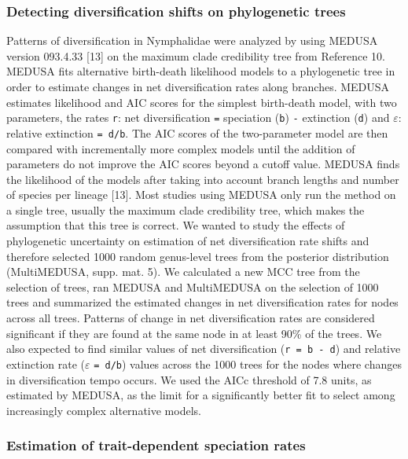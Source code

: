 \documentclass[]{article}
\begin{document}
\subsubsection{Detecting diversification shifts on phylogenetic
trees}\label{detecting-diversification-shifts-on-phylogenetic-trees}

Patterns of diversification in Nymphalidae were analyzed by using MEDUSA
version 093.4.33 {[}13{]} on the maximum clade credibility tree from
Reference 10. MEDUSA fits alternative birth-death likelihood models to a
phylogenetic tree in order to estimate changes in net diversification
rates along branches. MEDUSA estimates likelihood and AIC scores for the
simplest birth-death model, with two parameters, the rates \texttt{r}:
net diversification \texttt{=} speciation (\texttt{b}) \texttt{-}
extinction (\texttt{d}) and \(\varepsilon\): relative extinction
\texttt{= d/b}. The AIC scores of the two-parameter model are then
compared with incrementally more complex models until the addition of
parameters do not improve the AIC scores beyond a cutoff value. MEDUSA
finds the likelihood of the models after taking into account branch
lengths and number of species per lineage {[}13{]}. Most studies using
MEDUSA only run the method on a single tree, usually the maximum clade
credibility tree, which makes the assumption that this tree is correct.
We wanted to study the effects of phylogenetic uncertainty on estimation
of net diversification rate shifts and therefore selected 1000 random
genus-level trees from the posterior distribution (MultiMEDUSA, supp.
mat. 5). We calculated a new MCC tree from the selection of trees, ran
MEDUSA and MultiMEDUSA on the selection of 1000 trees and summarized the
estimated changes in net diversification rates for nodes across all
trees. Patterns of change in net diversification rates are considered
significant if they are found at the same node in at least 90\% of the
trees. We also expected to find similar values of net diversification
(\texttt{r = b - d}) and relative extinction rate (\(\varepsilon\)
\texttt{= d/b}) values across the 1000 trees for the nodes where changes
in diversification tempo occurs. We used the AICc threshold of 7.8
units, as estimated by MEDUSA, as the limit for a significantly better
fit to select among increasingly complex alternative models.

\subsubsection{Estimation of trait-dependent speciation
rates}\label{estimation-of-trait-dependent-speciation-rates}
\end{document}
